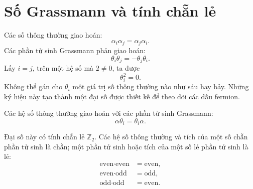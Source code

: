 \section{Số Grassmann và tính chẵn lẻ}

Các số thông thường giao hoán:
\begin{equation}
\alpha_i\alpha_j=\alpha_j\alpha_i.
\end{equation}
Các phần tử sinh Grassmann phản giao hoán:
\begin{equation}
\theta_i\theta_j=-\theta_j\theta_i.
\end{equation}
Lấy \(i=j\), trên một hệ số mà \(2\neq0\), ta được
\begin{equation}
\theta_i^2=0.
\end{equation}
Không thể gán cho \(\theta_i\) một giá trị số thông thường nào như sáu hay bảy. Những ký hiệu này tạo thành một đại số được thiết kế để theo dõi các dấu fermion.

Các hệ số thông thường giao hoán với các phần tử sinh Grassmann:
\begin{equation}
\alpha\theta_i=\theta_i\alpha.
\end{equation}

\begin{classroomqa}
\end{classroomqa}

Đại số này có tính chẵn lẻ \(\mathbb Z_2\). Các hệ số thông thường và tích của một số chẵn phần tử sinh là chẵn; một phần tử sinh hoặc tích của một số lẻ phần tử sinh là lẻ:
\begin{equation}
\begin{aligned}
\text{even}\cdot\text{even}&=\text{even},\\
\text{even}\cdot\text{odd}&=\text{odd},\\
\text{odd}\cdot\text{odd}&=\text{even}.
\end{aligned}
\end{equation}

\begin{classroomqa}
\end{classroomqa}

